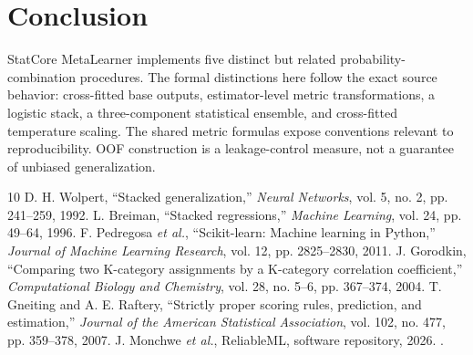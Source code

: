 ﻿\documentclass[conference]{IEEEtran}
\begin{document}
\section{Conclusion}
StatCore MetaLearner implements five distinct but related probability-combination procedures. The formal distinctions here follow the exact source behavior: cross-fitted base outputs, estimator-level metric transformations, a logistic stack, a three-component statistical ensemble, and cross-fitted temperature scaling. The shared metric formulas expose conventions relevant to reproducibility. OOF construction is a leakage-control measure, not a guarantee of unbiased generalization.

\begin{thebibliography}{10}
 D. H. Wolpert, ``Stacked generalization,'' \emph{Neural Networks}, vol. 5, no. 2, pp. 241--259, 1992.
 L. Breiman, ``Stacked regressions,'' \emph{Machine Learning}, vol. 24, pp. 49--64, 1996.
 F. Pedregosa \emph{et al.}, ``Scikit-learn: Machine learning in Python,'' \emph{Journal of Machine Learning Research}, vol. 12, pp. 2825--2830, 2011.
 J. Gorodkin, ``Comparing two K-category assignments by a K-category correlation coefficient,'' \emph{Computational Biology and Chemistry}, vol. 28, no. 5--6, pp. 367--374, 2004.
 T. Gneiting and A. E. Raftery, ``Strictly proper scoring rules, prediction, and estimation,'' \emph{Journal of the American Statistical Association}, vol. 102, no. 477, pp. 359--378, 2007.
 J. Monchwe \emph{et al.}, ReliableML, software repository, 2026. \projecturl.
\end{thebibliography}
\end{document}
